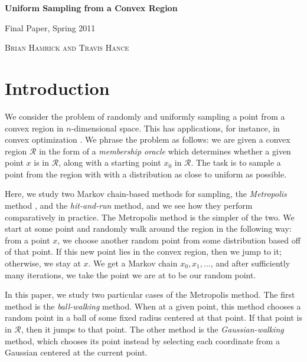 \documentclass[11pt]{article}
\begin{document}
\begin{center} \begin{LARGE} {\sc \bf Uniform Sampling from a Convex Region} \vspace{6pt}

{ Final Paper, Spring 2011} \vspace{9pt}

\end{LARGE} { \Large \textsc{Brian Hamrick and Travis Hance}}

\end{center}

\section{Introduction}

We consider the problem of randomly and uniformly sampling a point from a convex region in $n$-dimensional space. This has applications, for instance, in convex optimization \cite{Dabbene}. We phrase the problem as follows: we are given a convex region $\mathcal{R}$ in the form of a \emph{membership oracle} which determines whether a given point $x$ is in $\mathcal{R}$, along with a starting point $x_0$ in $\mathcal{R}$. The task is to sample a point from the region with with a distribution as close to uniform as possible.

Here, we study two Markov chain-based methods for sampling, the \emph{Metropolis} method \cite{Metropolis}, and the \emph{hit-and-run} \cite{Vempala} method, and we see how they perform comparatively in practice. The Metropolis method is the simpler of the two. We start at some point and randomly walk around the region in the following way: from a point $x$, we choose another random point from some distribution based off of that point. If this new point lies in the convex region, then we jump to it; otherwise, we stay at $x$. We get a Markov chain $x_0, x_1, ...$, and after sufficiently many iterations, we take the point we are at to be our random point.

In this paper, we study two particular cases of the Metropolis method. The first method is the \emph{ball-walking} method. When at a given point, this method chooses a random point in a ball of some fixed radius centered at that point. If that point is in $\mathcal{R}$, then it jumps to that point. The other method is the \emph{Gaussian-walking} method, which chooses its point instead by selecting each coordinate from a Gaussian centered at the current point.
\end{document}
